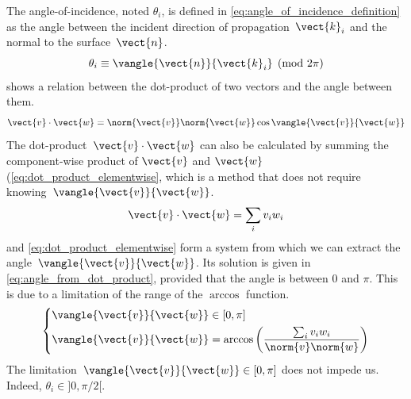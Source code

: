 The angle-of-incidence, noted $\theta_i$, is defined in \cref{eq:angle_of_incidence_definition} as the angle between the incident direction of propagation~$\vect{k}_i$ and the normal to the surface~$\vect{n}$.
\begin{equation}
    \theta_i \equiv \vangle{\vect{n}}{\vect{k}_i} \pmod{2\pi}
    \label{eq:angle_of_incidence_definition}
\end{equation}
 shows a relation between the dot-product of two vectors and the angle between them.
\begin{equation}
    \vect{v} \cdot \vect{w} = \norm{\vect{v}} \norm{\vect{w}} \cos \vangle{\vect{v}}{\vect{w}}
    \label{eq:dot_product_cos}
\end{equation}
The dot-product~$\vect{v} \cdot \vect{w}$ can also be calculated by summing the component-wise product of $\vect{v}$ and $\vect{w}$ (\cref{eq:dot_product_elementwise}, which is a method that does not require knowing~$\vangle{\vect{v}}{\vect{w}}$.
\begin{equation}
    \vect{v} \cdot \vect{w} = \sum_i v_i w_i
    \label{eq:dot_product_elementwise}
\end{equation}
 and \cref{eq:dot_product_elementwise} form a system from which we can extract the angle~$\vangle{\vect{v}}{\vect{w}}$.
Its solution is given in \cref{eq:angle_from_dot_product}, provided that the angle is between 0 and $\pi$.
This is due to a limitation of the range of the $\arccos$ function.
\begin{equation}
    \left\lbrace
        \begin{aligned}
            \vangle{\vect{v}}{\vect{w}} &\in [0, \pi]
            \\
            \vangle{\vect{v}}{\vect{w}} &= \arccos
            \left(
                \frac{
                    \sum_i v_i w_i
                }{
                    \norm{v} \norm{w}
                }
            \right)
        \end{aligned}
    \right.
    \label{eq:angle_from_dot_product}
\end{equation}
The limitation~$\vangle{\vect{v}}{\vect{w}} \in [0, \pi]$ does not impede us.
Indeed, $\theta_i \in ]0, \pi/2[$.
